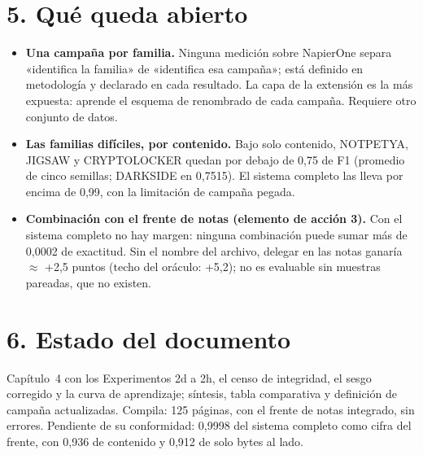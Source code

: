 \documentclass[11pt,a4paper]{article}
\begin{document}
\section*{5. Qué queda abierto}

\begin{itemize}
\item \textbf{Una campaña por familia.} Ninguna medición sobre NapierOne separa «identifica la
familia» de «identifica esa campaña»; está definido en metodología y declarado en cada resultado.
La capa de la extensión es la más expuesta: aprende el esquema de renombrado de cada campaña.
Requiere otro conjunto de datos.
\item \textbf{Las familias difíciles, por contenido.} Bajo solo contenido, NOTPETYA, JIGSAW y
CRYPTOLOCKER quedan por debajo de 0,75 de F1 (promedio de cinco semillas; DARKSIDE en 0,7515). El
sistema completo las lleva por encima de 0,99, con la limitación de campaña pegada.
\item \textbf{Combinación con el frente de notas (elemento de acción 3).} Con el sistema completo
no hay margen: ninguna combinación puede sumar más de 0,0002 de exactitud. Sin el nombre del
archivo, delegar en las notas ganaría $\approx$ +2,5 puntos (techo del oráculo: +5,2); no es evaluable
sin muestras pareadas, que no existen.
\end{itemize}

\section*{6. Estado del documento}

Capítulo~4 con los Experimentos 2d a 2h, el censo de integridad, el sesgo corregido y la curva de
aprendizaje; síntesis, tabla comparativa y definición de campaña actualizadas. Compila: 125 páginas, con
el frente de notas integrado, sin errores. Pendiente de su conformidad: 0,9998 del sistema completo como
cifra del frente, con 0,936 de contenido y 0,912 de solo bytes al lado.
\end{document}
